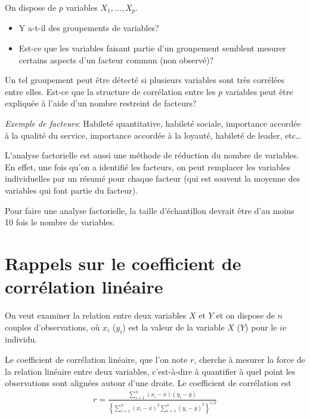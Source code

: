 \documentclass[
]{book}
\providecommand{\tightlist}{%
  \setlength{\itemsep}{0pt}\setlength{\parskip}{0pt}}
\theoremstyle{definition}
\theoremstyle{definition}
\theoremstyle{definition}
\theoremstyle{remark}
\begin{document}
On dispose de \(p\) variables \(X_1, \ldots, X_p\).

\begin{itemize}
\tightlist
\item
  Y a-t-il des groupements de variables?
\item
  Est-ce que les variables faisant partie d'un groupement semblent mesurer certains aspects d'un facteur commun (non observé)?
\end{itemize}

Un tel groupement peut être détecté si plusieurs variables sont très corrélées entre elles. Est-ce que la structure de corrélation entre les \(p\) variables peut être expliquée à l'aide d'un nombre restreint de facteurs?

\emph{Exemple de facteurs}: Habileté quantitative, habileté sociale, importance accordée à la qualité du service, importance accordée à la loyauté, habileté de leader, etc\ldots

L'analyse factorielle est aussi une méthode de réduction du nombre de variables. En effet, une fois qu'on a identifié les facteurs, on peut remplacer les variables individuelles par un résumé pour chaque facteur (qui est souvent la moyenne des variables qui font partie du facteur).

Pour faire une analyse factorielle, la taille d'échantillon devrait être d'au moins 10 fois le nombre de variables.

\hypertarget{rappels-sur-le-coefficient-de-corruxe9lation-linuxe9aire}{%
\section{Rappels sur le coefficient de corrélation linéaire}\label{rappels-sur-le-coefficient-de-corruxe9lation-linuxe9aire}}

On veut examiner la relation entre deux variables \(X\) et \(Y\) et on dispose de \(n\) couples d'observations, où \(x_i\) (\(y_i\)) est la valeur de la variable \(X\) (\(Y\)) pour le \(i\)e individu.

Le coefficient de corrélation linéaire, que l'on note \(r\), cherche à mesurer la force de la relation linéaire entre deux variables, c'est-à-dire à quantifier à quel point les observations sont alignées autour d'une droite. Le coefficient de corrélation est
\begin{align*}
r = \frac{\sum_{i=1}^n (x_i-\overline{x})(y_i -\bar{y})}{\left\{\sum_{i=1}^n (x_i-\overline{x})^2 \sum_{i=1}^n(y_i -\bar{y})^2\right\}^{1/2}}
\end{align*}
\end{document}
